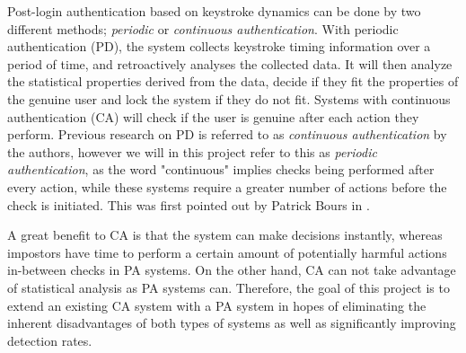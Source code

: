 \documentclass[informationsecurity]{gucmasterproject}
\begin{document}
Post-login authentication based on keystroke dynamics can be done by two different methods; \textit{periodic} or \textit{continuous authentication}.
With periodic authentication (PD), the system collects keystroke timing information over a period of time, and retroactively analyses the collected data.
It will then analyze the statistical properties derived from the data, decide if they fit the properties of the genuine user and lock the system if they do not fit.
Systems with continuous authentication (CA) will check if the user is genuine after each action they perform.
Previous research on PD is referred to as \textit{continuous authentication} by the authors, however we will in this project refer to this as \textit{periodic authentication}, as the word "continuous" implies checks being performed after every action, while these systems require a greater number of actions before the check is initiated. This was first pointed out by Patrick Bours in \cite{BOURS201236}.

A great benefit to CA is that the system can make decisions instantly, whereas impostors have time to perform a certain amount of potentially harmful actions in-between checks in PA systems.
On the other hand, CA can not take advantage of statistical analysis as PA systems can.
Therefore, the goal of this project is to extend an existing CA system with a PA system in hopes of eliminating the inherent disadvantages of both types of systems as well as significantly improving detection rates.


%
%
\end{document}
